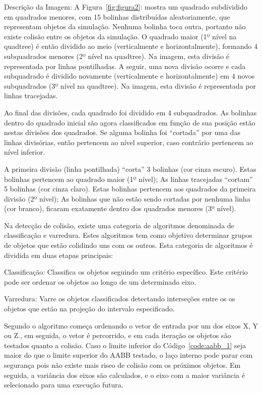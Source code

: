 \begin{framed}
\footnotesize

\noindent Descrição da Imagem: A Figura~\ref{fig:figura2}: mostra um quadrado subdividido em quadrados menores, com 15 bolinhas distribuídas aleatoriamente, que representam objetos da simulação. Nenhuma bolinha toca outra, portanto não existe colisão entre os objetos da simulação. O quadrado maior (1º nível na quadtree) é então dividido ao meio (verticalmente e horizontalmente), formando 4 subquadrados menores (2º nível na quadtree). Na imagem, esta divisão é representada por linhas pontilhadas. A seguir, uma nova divisão ocorre e cada subquadrado é dividido novamente (verticalmente e horizontalmente) em 4 novos subquadrados (3º nível na quadtree). Na imagem, esta divisão é representada por linhas tracejadas. 

\noindent Ao final das divisões, cada quadrado foi dividido em 4 subquadrados. As bolinhas dentro do quadrado inicial são agora classificados em função de sua posição estão nestas divisões dos quadrados. Se alguma bolinha foi “cortada” por uma das linhas divisórias, então pertencem ao nível superior, caso contrário pertencem ao nível inferior.

\noindent A primeira divisão (linha pontilhada) “corta” 3 bolinhas (cor cinza escuro). Estas bolinhas pertencem ao quadrado maior (1º nível); As linhas tracejadas “cortam” 5 bolinhas (cor cinza claro). Estas bolinhas pertencem aos quadrados da primeira divisão (2º nível); As bolinhas que não estão sendo cortadas por nenhuma linha (cor branco), ficaram exatamente dentro dos quadrados menores (3º nível).
\end{framed}



Na detecção de colisão, existe uma categoria de algoritmos denominada de
classificação e varredura. Estes algoritmos tem como objetivo determinar grupos
de objetos que estão colidindo uns com os outros. Esta categoria de algoritmos é dividida em duas etapas principais:

Classificação: Classifica os objetos seguindo um critério específico. Este
critério pode ser ordenar os objetos ao longo de um determinado eixo.

Varredura: Varre os objetos classificados detectando interseções entre os os
objetos que estão na projeção do intervalo especificado.

Segundo  o algoritmo começa ordenando o vetor de entrada por um dos eixos X, Y ou Z., em
seguida, o vetor é percorrido, e em cada iteração os objetos são testados
quanto a colisão. Caso o limite inferior do Código~\ref{code:aabb_1} seja maior do
que o limite superior do AABB testado, o laço interno pode parar com segurança
pois não existe mais risco de colisão com os próximos objetos. Em seguida, a
variância dos eixos são calculados, e o eixo com a maior variância é
selecionado para uma execução futura.

